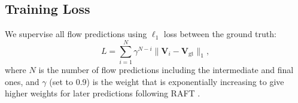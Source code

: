 \documentclass[10pt,twocolumn,letterpaper]{article}
\begin{document}
\subsection{Training Loss}
We supervise all flow predictions using $\ell_1$ loss between the ground truth:
\begin{equation}
    L = \sum_{i=1}^{N} \gamma^{N - i} \| {\bm V}_i - {\bm V}_{\mathrm{gt}} \|_1,
\end{equation}
where $N$ is the number of flow predictions including the intermediate and final ones, and $\gamma$ (set to 0.9) is the weight that is exponentially increasing to give higher weights for later predictions following RAFT \cite{teed2020raft}.
\end{document}
